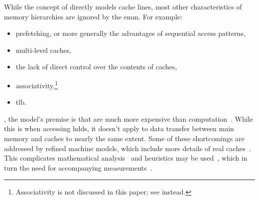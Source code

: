 While the concept of  directly models cache lines, most other
characteristics of memory hierarchies are ignored by the \gls{emm}.  For example:
\begin{itemize} %
  \item prefetching, or more generally the advantages of sequential access patterns,
  \item multi-level caches,
  \item the lack of direct control over the contents of caches, %
  \item associativity,\footnote{%
      Associativity is not discussed in this paper; see \textcite{drepper2007} instead.
    }
  \item \gls{tlb}.
\end{itemize}
%
%
%
, the model's premise is that  are
much more expensive than computation~\cite[188]{afmh}.
While this is  when accessing \glspl{hdd}, it
doesn't apply to data transfer between main memory and caches to nearly the same extent.
%
Some of these shortcomings are addressed by refined machine models, which include more
details of real caches~\cite[178]{afmh}.
%
This complicates mathematical analysis~\cite[181]{afmh} and heuristics may be
used~\cite[191]{afmh}, which in turn  the need for
accompanying measurements~\cite[181]{afmh}.



